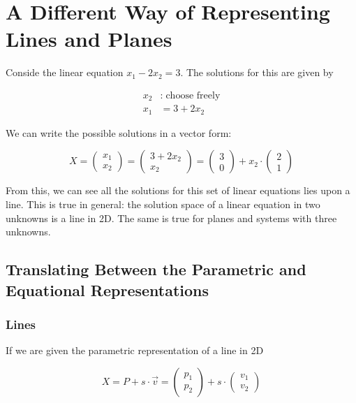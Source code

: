 \documentclass{article}
\begin{document}
	\section{A Different Way of Representing Lines and Planes}
	Conside the linear equation $x_{1} - 2x_{2} = 3$. The solutions for this are given by
	
	\begin{align*}
	x_{2} &: \; \text{choose freely} \\
	x_{1} &= 3 + 2x_{2}
	\end{align*}
	
	We can write the possible solutions in a vector form:
	
	\[ X = \left( \begin{array}{c} x_{1} \\ x_{2} \end{array} \right) = \left(\begin{array}{c} 3 + 2x_{2} \\ x_{2} \end{array} \right) = \left( \begin{array}{c} 3 \\ 0 \end{array} \right) + x_{2} \cdot \left( \begin{array}{c} 2 \\ 1 \end{array} \right) \]
	
	From this, we can see all the solutions for this set of linear equations lies upon a line. This is true in general: the solution space of a linear equation in two unknowns is a line in 2D. The same is true for planes and systems with three unknowns.
	
	\subsection{Translating Between the Parametric and Equational Representations}
	\subsubsection{Lines}
	If we are given the parametric representation of a line in 2D
	
	\[ X = P + s \cdot \overrightarrow{v} = \left( \begin{array}{c}p_{1} \\ p_{2} \end{array} \right) + s \cdot \left( \begin{array}{c} v_{1} \\ v_{2} \end{array} \right) \]
	
\end{document}
